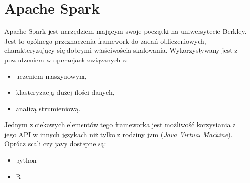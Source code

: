 \section{Apache Spark}
Apache Spark jest narzędziem mającym swoje początki na uniwersytecie Berkley.
Jest to ogólnego przeznaczenia framework do zadań obliczeniowych,
charakteryzujący się dobrymi właściwościa skalowania.
Wykorzystywany jest z powodzeniem w operacjach związanych z:
\begin{itemize}
  \item uczeniem maszynowym,
  \item klasteryzacją dużej ilości danych,
  \item analizą strumieniową.
\end{itemize}


Jednym z ciekawych elementów tego frameworka
jest możliwość korzystania z jego API w innych językach niż tylko z rodziny jvm (\textit{Java Virtual Machine}).
Oprócz scali czy javy dostepne są:
\begin{itemize}
  \item python
  \item R
\end{itemize}


